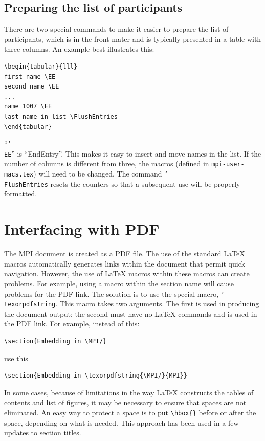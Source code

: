 \documentclass[letterpaper,twoside,11pt,fleqn]{article}
\def\cmd#1{\texttt{\char`\\#1}}
\def\MPI/{\textsf{MPI}}    %
\begin{document}
\subsection{Preparing the list of participants}
There are two special commands to make it easier to prepare the list
of participants, which is in the front mater and is typically
presented in a table with three columns.  An example best illustrates this:
\begin{verbatim}
\begin{tabular}{lll}
first name \EE
second name \EE
...
name 1007 \EE
last name in list \FlushEntries
\end{tabular}
\end{verbatim}
``\cmd{EE}'' is ``EndEntry''.  This makes it easy to insert and move names
in the list.  If the number of columns is different from three, the
macros (defined in \texttt{mpi-user-macs.tex}) will need to be
changed.
The command \cmd{FlushEntries} resets the counters so that a
subsequent use will be properly formatted.

\section{Interfacing with PDF}
\label{sec:pdf}
The \MPI/ document is created as a PDF file.  The use of the standard
LaTeX macros automatically generates links within the document that
permit quick navigation.  However, the use of LaTeX macros within
these macros can create problems.  For example, using a macro within
the section name will cause problems for the PDF link.  The solution
is to use the special macro, \cmd{texorpdfstring}.  This macro takes
two arguments.  The first is used in producing the document output;
the second must have no LaTeX commands and is used in the PDF link.
For example, instead of this:
\begin{verbatim}
\section{Embedding in \MPI/}
\end{verbatim}
use this
\begin{verbatim}
\section{Embedding in \texorpdfstring{\MPI/}{MPI}}
\end{verbatim}
In some cases, because of limitations in the way LaTeX constructs the
tables of contents and list of figures, it may be necessary to ensure
that spaces are not eliminated.  An easy way to protect a space is to
put \verb+\hbox{}+ before or after the space, depending on what is
needed.  This approach has been used in a few updates to section titles.
\end{document}
